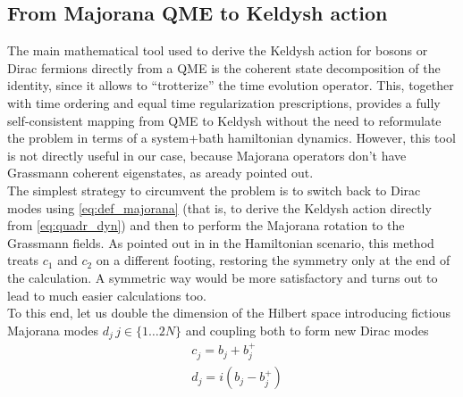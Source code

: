 \documentclass[a4paper,11pt]{article}
\theoremstyle{remark}
\begin{document}
  \subsection{From Majorana QME to Keldysh action}
  The main mathematical tool used to derive the Keldysh action for bosons or Dirac fermions directly from a QME is the coherent state decomposition of the identity, since it allows to ``trotterize'' the time evolution operator. This, together with time ordering and equal time regularization prescriptions, provides a fully self-consistent mapping from QME to Keldysh without the need to reformulate the problem in terms of a system+bath hamiltonian dynamics. However, this tool is not directly useful in our case, because Majorana operators don't have Grassmann coherent eigenstates, as aready pointed out.\\ The simplest strategy to circumvent the problem is to switch back to Dirac modes using \ref{eq:def_majorana} (that is, to derive the Keldysh action directly from \ref{eq:quadr_dyn}) and then to perform the Majorana rotation to the Grassmann fields. As pointed out in \cite{Nilsson2013} in the Hamiltonian scenario, this method treats $c_1$ and $c_2$ on a different footing, restoring the symmetry only at the end of the calculation. A symmetric way would be more satisfactory and turns out to lead to much easier calculations too.\\ To this end, let us double the dimension of the Hilbert space introducing fictious Majorana modes $d_j\,j\in\{1\dots2N\}$ and coupling both to form new Dirac modes
  \begin{equation}
   \label{eq:def_majorana_doubling}
   \begin{aligned}
   &c_j^{ } = b_j^{ }+b_j^+\\
   &d_j^{ } = i\left(b^{ }_j - b^{+}_j\right)
   \end{aligned}
  \end{equation}
\end{document}
